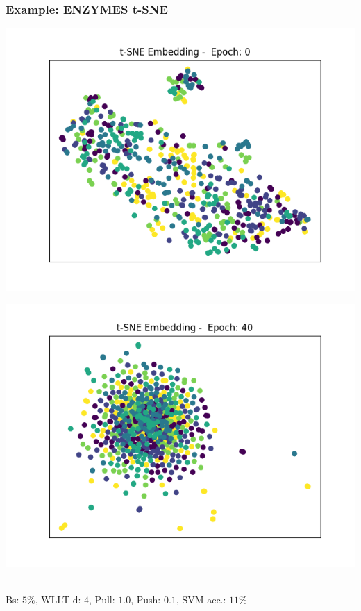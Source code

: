 \begin{frame}\frametitle{Example: ENZYMES t-SNE}
	\begin{minipage}{0.49\textwidth}
		\includegraphics[width=\textwidth]{images/plot14tSNE}
	\end{minipage}
	\begin{minipage}{0.49\textwidth}
		\includegraphics[width=\textwidth]{images/plot15tSNE}
	\end{minipage}
	\vspace{2cm} \\
	\tiny{Bs: $5\%$, WLLT-d: $4$, Pull: $1.0$, Push: $0.1$, SVM-acc.: $11\%$}
\end{frame}

